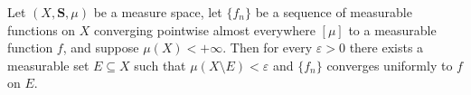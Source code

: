 Let $(X, \mathbf{S}, \mu)$ be a measure space, let $\{f_n\}$ be a sequence of measurable functions on $X$ converging pointwise almost everywhere $[\mu]$ to a measurable function $f$, and suppose $\mu(X) < +\infty$. Then for every $\varepsilon > 0$ there exists a measurable set $E \subseteq X$ such that $\mu(X \setminus E) < \varepsilon$ and $\{f_n\}$ converges uniformly to $f$ on $E$.
